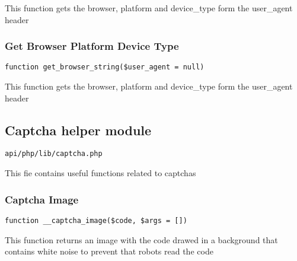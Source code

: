 \documentclass[a4paper]{article}
\begin{document}
This function gets the browser, platform and device\_type form the user\_agent header

\hypertarget{toc391}{}
\subsubsection{Get Browser Platform Device Type}

\begin{lstlisting}
function get_browser_string($user_agent = null)
\end{lstlisting}

This function gets the browser, platform and device\_type form the user\_agent header

\hypertarget{toc392}{}
\subsection{Captcha helper module}

\begin{lstlisting}
api/php/lib/captcha.php
\end{lstlisting}

This fie contains useful functions related to captchas

\hypertarget{toc393}{}
\subsubsection{Captcha Image}

\begin{lstlisting}
function __captcha_image($code, $args = [])
\end{lstlisting}

This function returns an image with the code drawed in a background that
contains white noise to prevent that robots read the code
\end{document}
